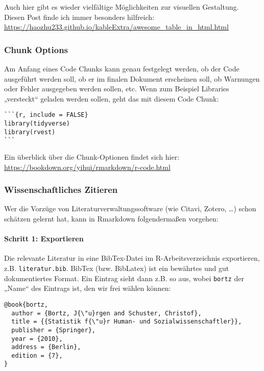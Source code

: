 \documentclass[
  ngerman,
]{article}
\begin{document}
Auch hier gibt es wieder vielfältige Möglichkeiten zur visuellen Gestaltung. Diesen Post finde ich immer besonders hilfreich: \url{https://haozhu233.github.io/kableExtra/awesome_table_in_html.html}

\hypertarget{chunk-options}{%
\subsubsection{Chunk Options}\label{chunk-options}}

Am Anfang eines Code Chunks kann genau festgelegt werden, ob der Code ausgeführt werden soll, ob er im finalen Dokument erscheinen soll, ob Warnungen oder Fehler ausgegeben werden sollen, etc. Wenn zum Beispiel Libraries „versteckt`` geladen werden sollen, geht das mit diesem Code Chunk:

\begin{verbatim}
```{r, include = FALSE}
library(tidyverse)
library(rvest)
```
\end{verbatim}

Ein überblick über die Chunk-Optionen findet sich hier: \url{https://bookdown.org/yihui/rmarkdown/r-code.html}

\hypertarget{wissenschaftliches-zitieren}{%
\subsubsection{Wissenschaftliches Zitieren}\label{wissenschaftliches-zitieren}}

Wer die Vorzüge von Literaturverwaltungssoftware (wie Citavi, Zotero, \ldots) schon schätzen gelernt hat, kann in Rmarkdown folgendermaßen vorgehen:

\hypertarget{schritt-1-exportieren}{%
\paragraph{Schritt 1: Exportieren}\label{schritt-1-exportieren}}

Die relevante Literatur in eine BibTex-Datei im R-Arbeitsverzeichnis exportieren, z.B. \texttt{literatur.bib}. BibTex (bzw. BibLatex) ist ein bewährtes und gut dokumentiertes Format. Ein Eintrag sieht dann z.B. so aus, wobei \texttt{bortz} der „Name`` des Eintrags ist, den wir frei wählen können:

\begin{verbatim}
@book{bortz,
  author = {Bortz, J{\"u}rgen and Schuster, Christof},
  title = {{Statistik f{\"u}r Human- und Sozialwissenschaftler}},
  publisher = {Springer},
  year = {2010},
  address = {Berlin},
  edition = {7},
}
\end{verbatim}
\end{document}
